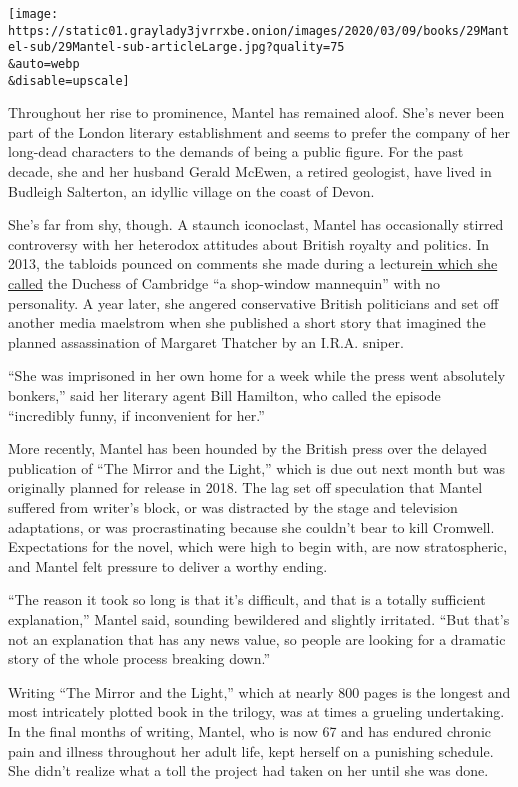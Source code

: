 \texttt{[image: https://static01.graylady3jvrrxbe.onion/images/2020/03/09/books/29Mantel-sub/29Mantel-sub-articleLarge.jpg?quality=75\\\&auto=webp\\\&disable=upscale]}

Throughout her rise to prominence, Mantel has remained aloof. She's
never been part of the London literary establishment and seems to prefer
the company of her long-dead characters to the demands of being a public
figure. For the past decade, she and her husband Gerald McEwen, a
retired geologist, have lived in Budleigh Salterton, an idyllic village
on the coast of Devon.

She's far from shy, though. A staunch iconoclast, Mantel has
occasionally stirred controversy with her heterodox attitudes about
British royalty and politics. In 2013, the tabloids pounced on comments
she made during a
lecture\href{https://www.theguardian.com/uk/2013/feb/19/kate-duchess-cambridge-hilary-mantel}{in
which she called} the Duchess of Cambridge ``a shop-window mannequin''
with no personality. A year later, she angered conservative British
politicians and set off another media maelstrom when she published a
short story that imagined the planned assassination of Margaret Thatcher
by an I.R.A. sniper.

``She was imprisoned in her own home for a week while the press went
absolutely bonkers,'' said her literary agent Bill Hamilton, who called
the episode ``incredibly funny, if inconvenient for her.''

More recently, Mantel has been hounded by the British press over the
delayed publication of ``The Mirror and the Light,'' which is due out
next month but was originally planned for release in 2018. The lag set
off speculation that Mantel suffered from writer's block, or was
distracted by the stage and television adaptations, or was
procrastinating because she couldn't bear to kill Cromwell. Expectations
for the novel, which were high to begin with, are now stratospheric, and
Mantel felt pressure to deliver a worthy ending.

``The reason it took so long is that it's difficult, and that is a
totally sufficient explanation,'' Mantel said, sounding bewildered and
slightly irritated. ``But that's not an explanation that has any news
value, so people are looking for a dramatic story of the whole process
breaking down.''

Writing ``The Mirror and the Light,'' which at nearly 800 pages is the
longest and most intricately plotted book in the trilogy, was at times a
grueling undertaking. In the final months of writing, Mantel, who is now
67 and has endured chronic pain and illness throughout her adult life,
kept herself on a punishing schedule. She didn't realize what a toll the
project had taken on her until she was done.


